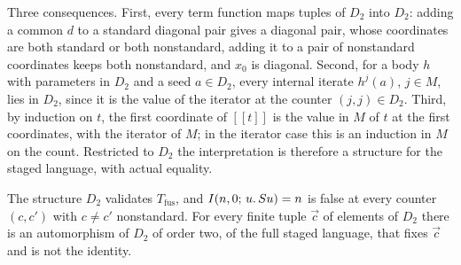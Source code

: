 Three consequences. First, every term function maps tuples of $D_2$ into
$D_2$: adding a common $d$ to a standard diagonal pair gives a diagonal pair,
whose coordinates are both standard or both nonstandard, adding it to a pair of
nonstandard coordinates keeps both nonstandard, and $x_0$ is diagonal. Second,
for a body $h$ with parameters in $D_2$ and a seed $a\in D_2$, every internal
iterate $h^{j}(a)$, $j\in M$, lies in $D_2$, since it is the value of the
iterator at the counter $(j,j)\in D_2$. Third, by induction on $t$, the first
coordinate of $[\![t]\!]$ is the value in $M$ of $t$ at the first coordinates,
with the iterator of $M$; in the iterator case this is an induction in $M$ on
the count. Restricted to $D_2$ the interpretation is therefore a structure for
the staged language, with actual equality.

\begin{theorem}
\label{obs:thm:fusion-barrier}
The structure $D_2$ validates $T_{\mathrm{fus}}$, and $I(n,0;\,u.\,S u)=n$
is false at every counter $(c,c')$ with $c\ne c'$ nonstandard. For every finite
tuple $\vec c$ of elements of $D_2$ there is an automorphism of $D_2$ of order
two, of the full staged language, that fixes $\vec c$ and is not the
identity.
\end{theorem}

